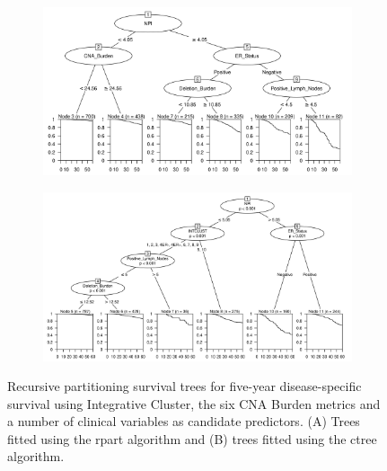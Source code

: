 \begin{figure}[!h]
\centering

\vspace{1cm}

\begin{subfigure}{\textwidth}
\subcaption{}
\includegraphics[width=1\textwidth]{../figures/Chapter_3/Clin_PartyKit_Survival_Burden_FiveYearDSS_INTCLUST.png}
\end{subfigure}

\vspace{3cm}

\begin{subfigure}{\textwidth}
\subcaption{}
\includegraphics[width=1\textwidth]{../figures/Chapter_3/Clin_Ctree_Survival_Burden_FiveYearDSS_INTCLUST.png}
\end{subfigure}

\vspace{1cm}

\caption[Recursive partitioning survival trees for five-year disease-specific survival using Integrative Cluster, the six CNA Burden metrics and a number of clinical variables as candidate predictors.]{Recursive partitioning survival trees for five-year disease-specific survival using Integrative Cluster, the six CNA Burden metrics and a number of clinical variables as candidate predictors. (A) Trees fitted using the rpart algorithm and (B) trees fitted using the ctree algorithm.}
\label{fig:INTCLUST_CNA_Burden_FiveYearDSS_Clin}
\end{figure}


